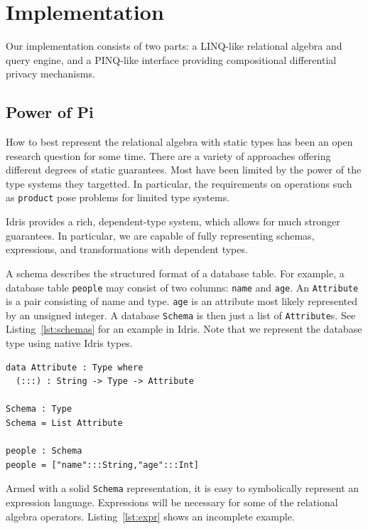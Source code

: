 \documentclass[12pt]{article}
\begin{document}
\section{Implementation}\label{sec:implementation}

Our implementation consists of two parts: a LINQ-like relational algebra and query engine, and a PINQ-like interface providing compositional differential privacy mechanisms.

\subsection{Power of Pi}\label{sec:power_of_pi}

How to best represent the relational algebra with static types has been an open research question for some time.
There are a variety of approaches offering different degrees of static guarantees.
Most have been limited by the power of the type systems they targetted.
In particular, the requirements on operations such as \texttt{product} pose problems for limited type systems.

Idris provides a rich, dependent-type system, which allows for much stronger guarantees.
In particular, we are capable of fully representing schemas, expressions, and transformations with dependent types.

A schema describes the structured format of a database table.
For example, a database table \texttt{people} may consist of two columns: \texttt{name} and \texttt{age}.
An \texttt{Attribute} is a pair consisting of name and type.
\texttt{age} is an attribute most likely represented by an unsigned integer.
A database \texttt{Schema} is then just a list of \texttt{Attribute}s.
See Listing~\ref{lst:schemas} for an example in Idris.
Note that we represent the database type using native Idris types.

\begin{lstlisting}[label={lst:schemas},caption=Representing schemas with dependent types]
data Attribute : Type where
  (:::) : String -> Type -> Attribute

Schema : Type
Schema = List Attribute

people : Schema
people = ["name":::String,"age":::Int]
\end{lstlisting}

Armed with a solid \texttt{Schema} representation, it is easy to symbolically represent an expression language.
Expressions will be necessary for some of the relational algebra operators.
Listing~\ref{lst:expr} shows an incomplete example.
\end{document}
